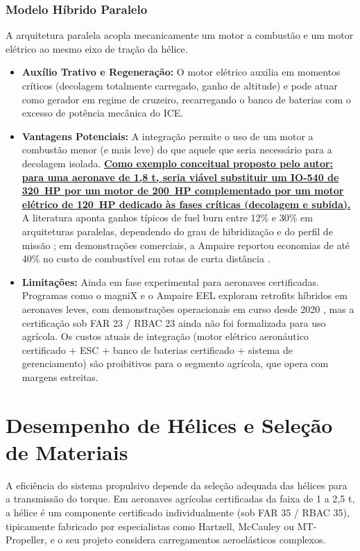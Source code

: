 \documentclass[a4paper,12pt]{article}
\newcommand{\autoeval}[1]{\textbf{\underline{#1}}}
\begin{document}
\subsubsection{Modelo Híbrido Paralelo}
A arquitetura paralela acopla mecanicamente um motor a combustão e um motor elétrico ao mesmo eixo de tração da hélice.

\begin{itemize}
    \item \textbf{Auxílio Trativo e Regeneração:} O motor elétrico auxilia em momentos críticos (decolagem totalmente carregado, ganho de altitude) e pode atuar como gerador em regime de cruzeiro, recarregando o banco de baterias com o excesso de potência mecânica do ICE.
    \item \textbf{Vantagens Potenciais:} A integração permite o uso de um motor a combustão menor (e mais leve) do que aquele que seria necessário para a decolagem isolada. \autoeval{Como exemplo conceitual proposto pelo autor: para uma aeronave de 1{,}8 t, seria viável substituir um IO-540 de \SI{320}{HP} por um motor de \SI{200}{HP} complementado por um motor elétrico de \SI{120}{HP} dedicado às fases críticas (decolagem e subida).} A literatura aponta ganhos típicos de fuel burn entre 12\% e 30\% em arquiteturas paralelas, dependendo do grau de hibridização e do perfil de missão \cite{sciencedirect_hybrid, fuel_economy_hybrid}; em demonstrações comerciais, a Ampaire reportou economias de até 40\% no custo de combustível em rotas de curta distância \cite{ampaire_demo}.
    \item \textbf{Limitações:} Ainda em fase experimental para aeronaves certificadas. Programas como o magniX e o Ampaire EEL exploram retrofits híbridos em aeronaves leves, com demonstrações operacionais em curso desde 2020 \cite{ampaire_demo, wiki_hybrid_electric}, mas a certificação sob FAR 23 / RBAC 23 ainda não foi formalizada para uso agrícola. Os custos atuais de integração (motor elétrico aeronáutico certificado + ESC + banco de baterias certificado + sistema de gerenciamento) são proibitivos para o segmento agrícola, que opera com margens estreitas.
\end{itemize}

\section{Desempenho de Hélices e Seleção de Materiais}

A eficiência do sistema propulsivo depende da seleção adequada das hélices para a transmissão do torque. Em aeronaves agrícolas certificadas da faixa de 1 a 2{,}5 t, a hélice é um componente certificado individualmente (sob FAR 35 / RBAC 35), tipicamente fabricado por especialistas como Hartzell, McCauley ou MT-Propeller, e o seu projeto considera carregamentos aeroelásticos complexos. 
\end{document}
